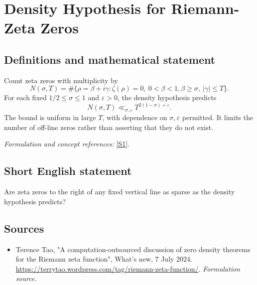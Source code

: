 \documentclass[11pt]{article}
\begin{document}
\section*{\texorpdfstring{Density Hypothesis for Riemann-Zeta Zeros}{Density Hypothesis for Riemann-Zeta Zeros}}\label{statement}
\subsection{Definitions and mathematical statement}
Count zeta zeros with multiplicity by
\[
 N(\sigma,T)=\#\{\rho=\beta+i\gamma:\zeta(\rho)=0,\ 0<\beta<1,
                                  \beta\ge\sigma,\ |\gamma|\le T\}.
\]
For each fixed $1/2\le\sigma\le1$ and $\varepsilon>0$, the density hypothesis predicts
\[
 N(\sigma,T)\ll_{\sigma,\varepsilon}T^{2(1-\sigma)+\varepsilon}.
\]
The bound is uniform in large $T$, with dependence on $\sigma,\varepsilon$ permitted. It limits the number of off-line zeros rather than asserting that they do not exist.
\par\smallskip\textit{Formulation and concept references:} \href{https://terrytao.wordpress.com/tag/riemann-zeta-function/}{[S1]}.

\subsection{Short English statement}
Are zeta zeros to the right of any fixed vertical line as sparse as the density hypothesis predicts?
\subsection{Sources}
\begin{itemize}
\item[S1]Terence Tao, "A computation-outsourced discussion of zero density theorems for the Riemann zeta function", What's new, 7 July 2024.
\url{https://terrytao.wordpress.com/tag/riemann-zeta-function/}.
\textit{Formulation source.}
\end{itemize}
\end{document}
